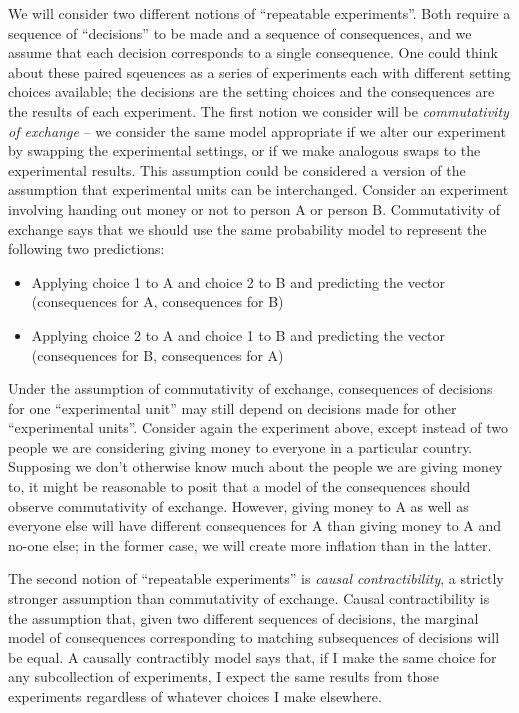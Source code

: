 We will consider two different notions of ``repeatable experiments''. Both require a sequence of ``decisions'' to be made and a sequence of consequences, and we assume that each decision corresponds to a single consequence. One could think about these paired sqeuences as a series of experiments each with different setting choices available; the decisions are the setting choices and the consequences are the results of each experiment. The first notion we consider will be \emph{commutativity of exchange} -- we consider the same model appropriate if we alter our experiment by swapping the experimental settings, or if we make analogous swaps to the experimental results. This assumption could be considered a version of the assumption that experimental units can be interchanged. Consider an experiment involving handing out money or not to person A or person B. Commutativity of exchange says that we should use the same probability model to represent the following two predictions: 
\begin{itemize}
    \item Applying choice 1 to A and choice 2 to B and predicting the vector (consequences for A, consequences for B)
    \item Applying choice 2 to A and choice 1 to B and predicting the vector (consequences for B, consequences for A)
\end{itemize}

Under the assumption of commutativity of exchange, consequences of decisions for one ``experimental unit'' may still depend on decisions made for other ``experimental units''. Consider again the experiment above, except instead of two people we are considering giving money to everyone in a particular country. Supposing we don't otherwise know much about the people we are giving money to, it might be reasonable to posit that a model of the consequences should observe commutativity of exchange. However, giving money to A as well as everyone else will have different consequences for A than giving money to A and no-one else; in the former case, we will create more inflation than in the latter.

The second notion of ``repeatable experiments'' is \emph{causal contractibility}, a strictly stronger assumption than commutativity of exchange. Causal contractibility is the assumption that, given two different sequences of decisions, the marginal model of consequences corresponding to matching subsequences of decisions will be equal. A causally contractibly model says that, if I make the same choice for any subcollection of experiments, I expect the same results from those experiments regardless of whatever choices I make elsewhere.


